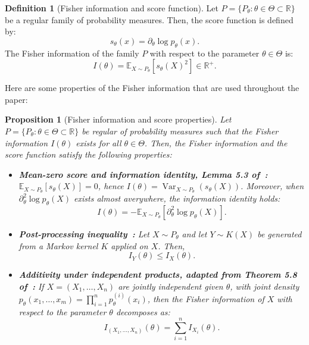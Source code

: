 \documentclass{article}
\theoremstyle{plain}
\newtheorem{proposition}{Proposition}[section]
\theoremstyle{definition}
\newtheorem{definition}[theorem]{Definition}
\theoremstyle{remark}
\DeclareMathOperator{\Var}{Var}
\begin{document}
\begin{definition}[Fisher information and score function]
    Let $P = \{P_\theta : \theta\in\Theta \subset \mathbb{R}\}$ be a regular family of probability measures. Then, the score function is defined by:
    \[s_\theta(x) = \partial_\theta \log p_\theta(x).\]
    The Fisher information of the family $P$ with respect to the parameter $\theta \in \Theta$ is:
    \[I(\theta) = \mathbb{E}_{X \sim P_\theta}[s_\theta(X)^2] \in \mathbb{R}^+.\]
\end{definition}

Here are some properties of the Fisher information that are used throughout the paper:

\begin{proposition}[Fisher information and score properties]
\label{prop:Fisher-properties}
    Let $P = \{P_\theta : \theta\in\Theta \subset \mathbb{R}\}$ be regular of probability  measures such that the Fisher information $I(\theta)$ exists for all $\theta \in \Theta$. Then, the Fisher information and the score function satisfy the following properties:
    \begin{itemize}
        \item \textbf{Mean-zero score and information identity, Lemma 5.3 of~\citet{Lehmann1998}:} $\mathbb{E}_{X \sim P_\theta}[s_\theta(X)] = 0$, hence $I(\theta) = \Var_{X \sim P_\theta}(s_\theta(X))$. Moreover, when $\partial_\theta^2 \log p_\theta(X)$ exists almost averywhere, the information identity holds: \[I(\theta) = - \mathbb{E}_{X \sim P_\theta}[\partial_\theta^2 \log p_\theta(X)].\]
        \item \textbf{Post-processing inequality~\citep{Schervish1995}:} Let $X\sim P_\theta$ and let $Y \sim K(X)$ be generated from a Markov kernel $K$ applied on $X$. Then, \[I_Y(\theta) \leq I_X(\theta).\]
        \item \textbf{Additivity under independent products, adapted from Theorem 5.8 of~\citet{Lehmann1998}:} If $X = (X_1,\dots,X_n)$ are jointly independent given $\theta$, with joint density $p_\theta(x_1,\dots,x_m)=\prod_{i=1}^n p^{(i)}_\theta(x_i)$, then the Fisher information of $X$ with respect to the parameter $\theta$ decomposes as: \[I_{(X_1,\dots,X_n)}(\theta) = \sum_{i=1}^n I_{X_i}(\theta).\]
    \end{itemize}
\end{proposition}
\end{document}
